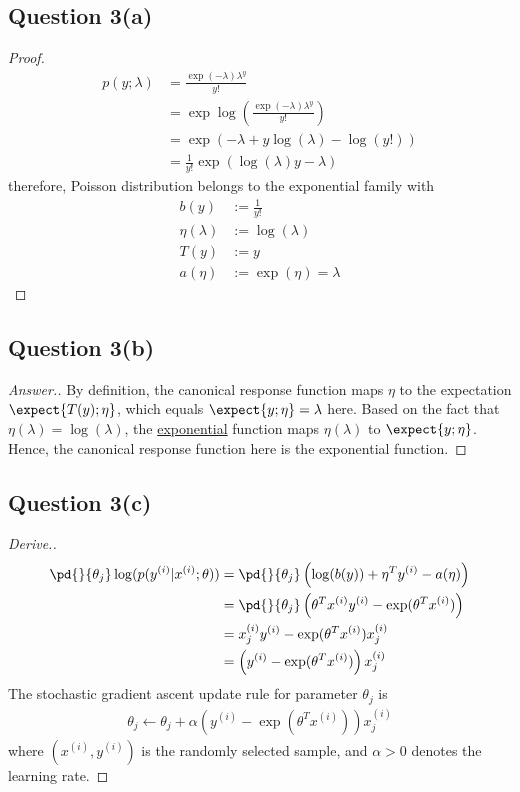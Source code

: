 \documentclass[11pt]{article}
\newcommand{\upi}[0]{^{(i)}}
\begin{document}
	\subsection{Question 3(a)}
	\begin{proof}
		\begin{align}
			p(y; \lambda) &= \frac{\exp(-\lambda) \lambda^y}{y!} \\
			&= \exp \log (\frac{\exp(-\lambda) \lambda^y}{y!}) \\
			&= \exp \left (
				- \lambda + y \log (\lambda) - \log(y!)
			\right ) \\
			&= \frac{1}{y!} \exp(\log(\lambda) y - \lambda)
		\end{align}
		therefore, Poisson distribution belongs to the exponential family with
		\begin{align}
			b(y) &:= \frac{1}{y!} \\
			\eta(\lambda) &:= \log(\lambda) \\
			T(y) &:= y \\
			a(\eta) &:= \exp(\eta) = \lambda
		\end{align}
	\end{proof}
	\newpage
	
	\subsection{Question 3(b)}
	\begin{proof}[Answer.]
	\par By definition, the canonical response function maps $\eta$ to the expectation $\expect{T(y); \eta}$, which equals $\expect{y; \eta} = \lambda$ here. Based on the fact that $\eta(\lambda) = \log(\lambda)$, the \ul{exponential} function maps $\eta(\lambda)$ to $\expect{y; \eta}$. Hence, the canonical response function here is the exponential function.
	\end{proof}
	
	\subsection{Question 3(c)}
	\begin{proof}[Derive.]
	\begin{align}
		\pd{}{\theta_j} \log (p(y\upi|x\upi; \theta)) &= \pd{}{\theta_j} 
		\left (\log(b(y)) + \eta^T y\upi - a(\eta) \right )\\
		&= \pd{}{\theta_j} \left (
		\theta^T x\upi y\upi - \exp(\theta^T x\upi)
		\right ) \\
		&= x\upi_j y\upi - \exp(\theta^T x\upi) x\upi_j \\
		&= \left(y\upi - \exp(\theta^T x\upi )\right) x\upi_j
	\end{align}
	The stochastic gradient ascent update rule for parameter $\theta_j$ is 
	\begin{align}
		\theta_j \leftarrow \theta_j + \alpha \left(y\upi - \exp(\theta^T x\upi )\right) x\upi_j
	\end{align}
	where $(x\upi, y\upi)$ is the randomly selected sample, and $\alpha > 0$ denotes the learning rate.
	\end{proof}
	
\end{document}
